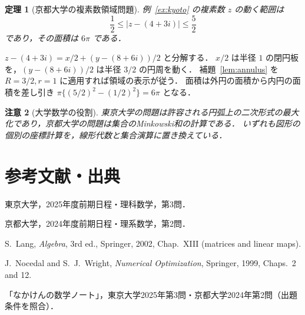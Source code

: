 \documentclass[a5paper,10pt,onecolumn]{jsarticle}
\makeatletter
\theoremstyle{mathnotetheorem}
\newtheorem{theorem}{定理}[section]
\newtheorem{remark}[theorem]{注意}
\renewcommand{\proofname}{証明}
\renewenvironment{proof}[1][\proofname]{%
  \par\pushQED{\qed}\normalfont\topsep4\p@\@plus2\p@\relax
  \trivlist\item[\hskip\labelsep\bfseries #1]\ignorespaces
}{\popQED\endtrivlist\@endpefalse}
\makeatother
\begin{document}
\begin{theorem}[京都大学の複素数領域問題]\label{thm:kyoto}
例~\ref{ex:kyoto} の複素数 $z$ の動く範囲は
\[
 \frac12\le|z-(4+3i)|\le\frac52
\]
であり，その面積は $6\pi$ である．
\end{theorem}
\begin{proof}
$z-(4+3i)=x/2+(y-(8+6i))/2$ と分解する．
$x/2$ は半径 $1$ の閉円板を，$(y-(8+6i))/2$ は半径 $3/2$ の円周を動く．
補題~\ref{lem:annulus} を $R=3/2,r=1$ に適用すれば領域の表示が従う．
面積は外円の面積から内円の面積を差し引き
$\pi\{(5/2)^2-(1/2)^2\}=6\pi$ となる．
\end{proof}

\begin{remark}[大学数学の役割]
東京大学の問題は許容される円弧上の二次形式の最大化であり，京都大学の問題は集合のMinkowski和の計算である．
いずれも図形の個別の座標計算を，線形代数と集合演算に置き換えている．
\end{remark}

\section*{参考文献・出典}
\begin{enumerate}[label={[\arabic*]}]
\item 東京大学，2025年度前期日程・理科数学，第3問．
\item 京都大学，2024年度前期日程・理系数学，第2問．
\item S.~Lang, \textit{Algebra}, 3rd ed., Springer, 2002, Chap.~XIII (matrices and linear maps).
\item J.~Nocedal and S.~J.~Wright, \textit{Numerical Optimization}, Springer, 1999, Chaps.~2 and 12.
\item 「なかけんの数学ノート」，東京大学2025年第3問・京都大学2024年第2問（出題条件を照合）．
\end{enumerate}
\end{document}
